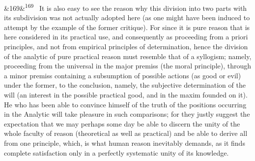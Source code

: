 \documentclass[12pt]{article}
\newcommand{\para}[1][]{\par\noindent\ifx&#1&\else\textsuperscript{\footnotesize #1}~\fi}
\begin{document}
\para[169] It is also easy to see the reason why this division into two parts with its subdivision was not actually adopted here (as one might have been induced to attempt by the example of the former critique). For since it is pure reason that is here considered in its practical use, and consequently as proceeding from a priori principles, and not from empirical principles of determination, hence the division of the analytic of pure practical reason must resemble that of a syllogism; namely, proceeding from the universal in the major premiss (the moral principle), through a minor premiss containing a subsumption of possible actions (as good or evil) under the former, to the conclusion, namely, the subjective determination of the will (an interest in the possible practical good, and in the maxim founded on it). He who has been able to convince himself of the truth of the positions occurring in the Analytic will take pleasure in such comparisons; for they justly suggest the expectation that we may perhaps some day be able to discern the unity of the whole faculty of reason (theoretical as well as practical) and be able to derive all from one principle, which, is what human reason inevitably demands, as it finds complete satisfaction only in a perfectly systematic unity of its knowledge.
\end{document}
